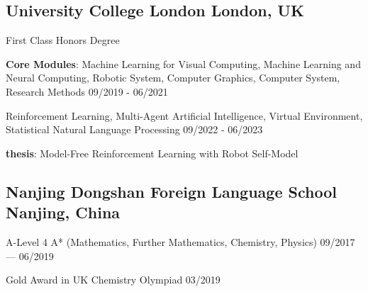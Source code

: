 
\subsection{
    University College London 
    \hfill London, UK
}
    \begin{zitemize}
        \item   First Class Honors Degree
        \item   \textbf{Core Modules}: Machine Learning for Visual Computing, 
                Machine Learning and Neural Computing, 
                Robotic System, 
                Computer Graphics, 
                Computer System,
                Research Methods 
                \hfill 09/2019 - 06/2021
        \item   Reinforcement Learning,    
                Multi-Agent Artificial Intelligence,
                Virtual Environment,
                Statistical Natural Language Processing
                \hfill 09/2022 - 06/2023
        \item   \textbf{thesis}: 
                Model-Free Reinforcement Learning with Robot Self-Model
    \end{zitemize}

\vspace{0.3em}


\subsection{
    Nanjing Dongshan Foreign Language School 
    \hfill Nanjing, China
}
    \begin{zitemize}
        \item   A-Level 4 A* (Mathematics, Further Mathematics, Chemistry, Physics) 
                \hfill 09/2017 --- 06/2019 
        \item   Gold Award in UK Chemistry Olympiad
                \hfill 03/2019
    \end{zitemize}


